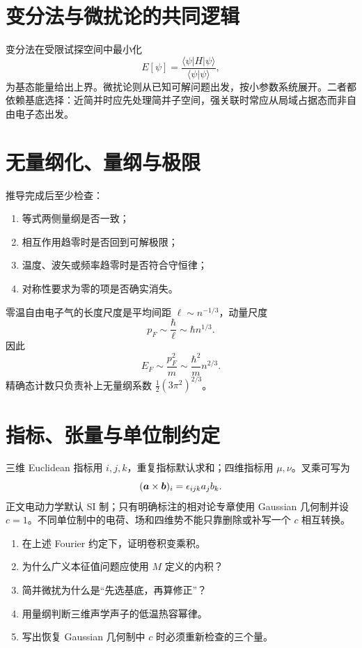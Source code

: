 \section{变分法与微扰论的共同逻辑}
变分法在受限试探空间中最小化
\[
E[\psi]=\frac{\langle\psi|H|\psi\rangle}
{\langle\psi|\psi\rangle},
\]
为基态能量给出上界。微扰论则从已知可解问题出发，按小参数系统展开。二者都依赖基底选择：近简并时应先处理简并子空间，强关联时常应从局域占据态而非自由电子态出发。

\section{无量纲化、量纲与极限}
推导完成后至少检查：
\begin{enumerate}
\item 等式两侧量纲是否一致；
\item 相互作用趋零时是否回到可解极限；
\item 温度、波矢或频率趋零时是否符合守恒律；
\item 对称性要求为零的项是否确实消失。
\end{enumerate}

\begin{examplebox}[title=量纲估算自由电子费米能]
零温自由电子气的长度尺度是平均间距
$\ell\sim n^{-1/3}$，动量尺度
\[
p_F\sim\frac{\hbar}{\ell}\sim\hbar n^{1/3}.
\]
因此
\[
E_F\sim\frac{p_F^2}{m}
\sim\frac{\hbar^2}{m}n^{2/3}.
\]
精确态计数只负责补上无量纲系数
$\frac12(3\pi^2)^{2/3}$。
\end{examplebox}

\section{指标、张量与单位制约定}
三维 Euclidean 指标用 $i,j,k$，重复指标默认求和；四维指标用
$\mu,\nu$。叉乘可写为
\[
(\bm{a}\times\bm{b})_i=\epsilon_{ijk}a_jb_k.
\]
正文电动力学默认 SI 制；只有明确标注的相对论专章使用 Gaussian 几何制并设 $c=1$。不同单位制中的电荷、场和四维势不能只靠删除或补写一个 $c$ 相互转换。

\begin{selftestbox}
\begin{enumerate}
\item 在上述 Fourier 约定下，证明卷积变乘积。
\item 为什么广义本征值问题应使用 $M$ 定义的内积？
\item 简并微扰为什么是“先选基底，再算修正”？
\item 用量纲判断三维声学声子的低温热容幂律。
\item 写出恢复 Gaussian 几何制中 $c$ 时必须重新检查的三个量。
\end{enumerate}
\end{selftestbox}
